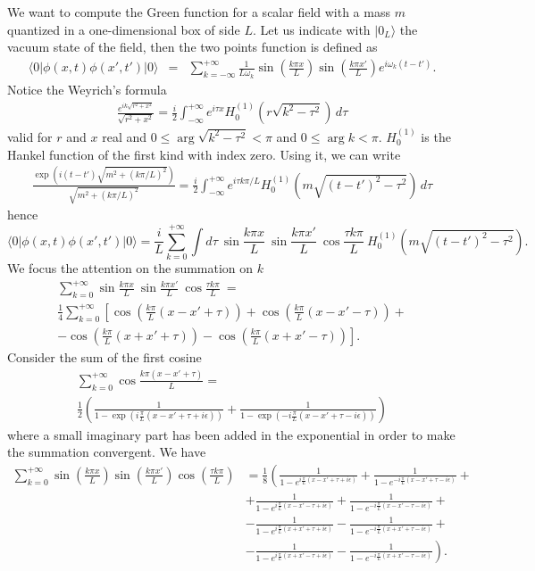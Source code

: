 \documentclass[11pt, nofootinbib]{revtex4-2}
\newcommand{\be}{\begin{equation}}
\newcommand{\ee}{\end{equation}}
\newcommand{\bea}{\begin{eqnarray}}
\newcommand{\eea}{\end{eqnarray}}
\begin{document}
We want to compute the Green function for a scalar field with a mass
$m$ quantized in a one-dimensional box of side $L$.  Let us indicate
with $| 0_L \rangle $ the vacuum state of the field, then the two
points function is defined as
%
\bea \langle 0| \phi(x,t) \phi(x',t') | 0 \rangle &=&
\sum_{k=-\infty}^{+\infty}\frac{1}{{L \omega_{k}}} \sin \left( \frac{k \pi
x}{L} \right) \sin \left( \frac{k \pi x'}{L} \right) e^{i \omega_{k} (t-t')}.
\eea
%
Notice the Weyrich's formula
%
\bea \frac{e^{ik \sqrt{r^2+x^2}}}{\sqrt{r^2+x^2}} = \frac{i}{2}
\int^{+ \infty}_{- \infty} e^{i \tau x} H^{(1)}_{0} \left( r
\sqrt{k^2- \tau^2} \right) \, d \tau \eea
%
valid for $r$ and $x$ real and $0 \leq \arg \sqrt{k^2- \tau^2} < \pi$
and $ 0 \leq \arg k < \pi$.  $H^{(1)}_{0}$ is the Hankel function of
the first kind with index zero.  Using it, we can write
%
\bea \frac{\exp \left({i(t-t') \sqrt{m^2+(k \pi
/L)^2}}\right)}{\sqrt{m^2+(k \pi /L)^2}} = \frac{i}{2} \int^{+
\infty}_{- \infty} e^{i \tau k \pi /L} H^{(1)}_{0} \left( m
\sqrt{(t-t')^2- \tau^2} \right) \, d \tau \eea
%
hence
%
\be \langle 0 | \phi(x,t) \phi(x',t') | 0 \rangle =
\frac{i}{{L}} \sum_{k=0}^{+\infty} \int d \tau\ \sin\frac{k \pi
x}{L}\ \sin\frac{k \pi x'}{L}\ 
\cos\frac{\tau k \pi}{L}\ H^{(1)}_{0} \left( m
\sqrt{(t-t')^2- \tau^2} \right). \ee
%
We focus the attention on the summation on $k$
%
\begin{multline}
\sum_{k=0}^{+\infty} \sin\frac{k \pi x}{L}\ \sin
\frac{k \pi x'}{L}\ \cos\frac{\tau k \pi}{L}
\ = \\
\frac{1}{4} \sum_{k=0}^{+\infty} \left[ \cos\left(\frac{k
\pi}{L}(x-x'+ \tau) \right) +\cos\left(\frac{k \pi}{L}(x-x'- \tau)
\right) + \right.  \\
\left.  - \cos\left(\frac{k \pi}{L}(x+x'+ \tau) \right)
-\cos\left(\frac{k \pi}{L}(x+x'- \tau) \right)\right] .
\end{multline}
%
Consider the sum of the first cosine
%
\begin{multline}
 \sum_{k=0}^{+\infty} \cos\frac{k \pi(x-x'+ \tau)}{L}
 = \\
 \frac{1}{2} \left( \frac{1}{1- \exp
\left(i\frac{\pi}{L}(x-x'+\tau+i \epsilon) \right)} + \frac{1}{1- \exp
\left(-i\frac{\pi}{L}(x-x'+ \tau-i \epsilon) \right)} \right) 
\end{multline}
%
where a small imaginary part has been added in the exponential in
order to make the summation convergent. We have 
%
\begin{align}
\sum_{k=0}^{+\infty} \sin \left( \frac{k \pi x}{L} \right) \sin
\left( \frac{k \pi x'}{L} \right) \cos \left(\frac{\tau k \pi}{L}
\right) &= \frac{1}{8} \left( \frac{1}{1-
e^{i\frac{\pi}{L}(x-x'+\tau+i \epsilon)} } + \frac{1}{1-
e^{-i\frac{\pi}{L}(x-x'+\tau-i \epsilon)} } + \right.  \nonumber\\
& + \frac{1}{1- e^{i\frac{\pi}{L}(x-x'-\tau+i \epsilon)} } +
\frac{1}{1- e^{-i\frac{\pi}{L}(x-x'-\tau-i \epsilon)} } + \nonumber\\
& - \frac{1}{1- e^{i\frac{\pi}{L}(x+x'+\tau+i \epsilon)} } -
\frac{1}{1- e^{-i\frac{\pi}{L}(x+x'+\tau-i \epsilon)} } + \nonumber\\
& - \left.  \frac{1}{1- e^{i\frac{\pi}{L}(x+x'-\tau+i \epsilon)} } -
\frac{1}{1- e^{-i\frac{\pi}{L}(x+x'-\tau-i \epsilon)} }\right).
\end{align}
\end{document}
